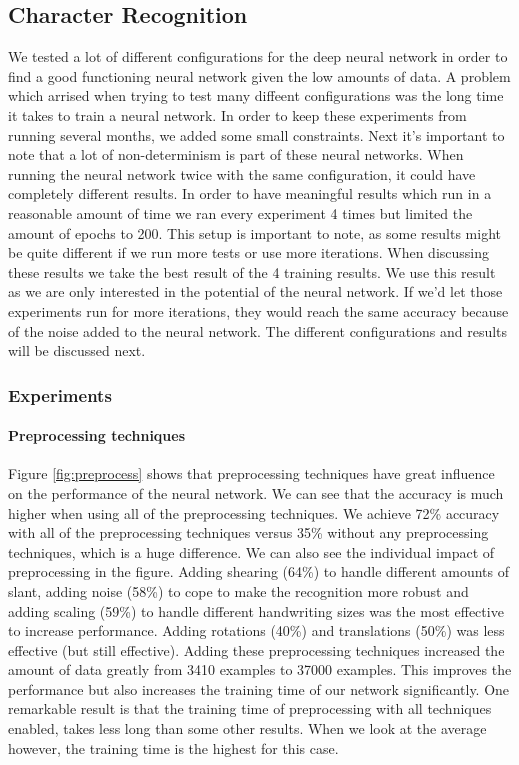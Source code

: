 \documentclass{article}
\begin{document}
\subsection{Character Recognition}
\label{sec:expres}
We tested a lot of different configurations for the deep neural network in order to find a good functioning neural network given the low amounts of data. A problem which arrised when trying to test many diffeent configurations was the long time it takes to train a neural network. In order to keep these experiments from running several months, we added some small constraints. Next it's important to note that a lot of non-determinism is part of these neural networks. When running the neural network twice with the same configuration, it could have completely different results. 
In order to have meaningful results which run in a reasonable amount of time we ran every experiment 4 times but limited the amount of epochs to 200. This setup is important to note, as some results might be quite different if we run more tests or use more iterations. When discussing these results we take the best result of the 4 training results. We use this result as we are only interested in the potential of the neural network. If we'd let those experiments run for more iterations, they would reach the same accuracy because of the noise added to the neural network. The different configurations and results will be discussed next. 
\subsubsection{Experiments}
\paragraph{Preprocessing techniques}
Figure \ref{fig:preprocess} shows that preprocessing techniques have great influence on the performance of the neural network. We can see that the accuracy is much higher when using all of the preprocessing techniques.  We achieve 72\% accuracy with all of the preprocessing techniques versus 35\% without any preprocessing techniques, which is a huge difference. We can also see the individual impact of preprocessing in the figure. Adding shearing (64\%) to handle different amounts of slant, adding noise (58\%) to cope to make the recognition more robust and adding scaling (59\%) to handle different handwriting sizes was the most effective to increase performance. Adding rotations (40\%) and translations (50\%) was less effective (but still effective). Adding these preprocessing techniques increased the amount of data greatly from 3410 examples to 37000 examples. This improves the performance but also increases the training time of our network significantly. One remarkable result is that the training time of preprocessing with all techniques enabled, takes less long than some other results. When we look at the average however, the training time is the highest for this case. 
\end{document}
